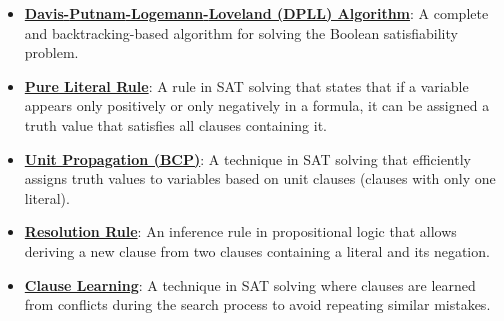 \documentclass{article}%
\begin{document}
\begin{itemize}[leftmargin=*]
\item \href{https://purdue.brightspace.com/d2l/common/assets/pdfjs-d2l-dist/1.0.14-legacy/web/viewer.html?file=\%2Fcontent\%2Fenforced\%2F1095467-wl.202510.CS.24300.001\%2F15L2-SAT.pdf\%3Fou\%3D1095467\&lang=en-us\&container=d2l-fileviewer-rendered-pdf\&fullscreen=d2l-fileviewer-rendered-pdf-dialog\&height=667#page=21}{\textbf{Davis{-}Putnam{-}Logemann{-}Loveland (DPLL) Algorithm}}: A complete and backtracking-based algorithm for solving the Boolean satisfiability problem.%
\item \href{https://purdue.brightspace.com/d2l/common/assets/pdfjs-d2l-dist/1.0.14-legacy/web/viewer.html?file=\%2Fcontent\%2Fenforced\%2F1095467-wl.202510.CS.24300.001\%2F15L2-SAT.pdf\%3Fou\%3D1095467\&lang=en-us\&container=d2l-fileviewer-rendered-pdf\&fullscreen=d2l-fileviewer-rendered-pdf-dialog\&height=667#page=19}{\textbf{Pure Literal Rule}}: A rule in SAT solving that states that if a variable appears only positively or only negatively in a formula, it can be assigned a truth value that satisfies all clauses containing it.%
\item \href{https://purdue.brightspace.com/d2l/common/assets/pdfjs-d2l-dist/1.0.14-legacy/web/viewer.html?file=\%2Fcontent\%2Fenforced\%2F1095467-wl.202510.CS.24300.001\%2F15L2-SAT.pdf\%3Fou\%3D1095467\&lang=en-us\&container=d2l-fileviewer-rendered-pdf\&fullscreen=d2l-fileviewer-rendered-pdf-dialog\&height=667#page=20}{\textbf{Unit Propagation (BCP)}}: A technique in SAT solving that efficiently assigns truth values to variables based on unit clauses (clauses with only one literal).%
\item \href{https://purdue.brightspace.com/d2l/common/assets/pdfjs-d2l-dist/1.0.14-legacy/web/viewer.html?file=\%2Fcontent\%2Fenforced\%2F1095467-wl.202510.CS.24300.001\%2F15L2-SAT.pdf\%3Fou\%3D1095467\&lang=en-us\&container=d2l-fileviewer-rendered-pdf\&fullscreen=d2l-fileviewer-rendered-pdf-dialog\&height=667#page=32}{\textbf{Resolution Rule}}: An inference rule in propositional logic that allows deriving a new clause from two clauses containing a literal and its negation.%
\item \href{https://purdue.brightspace.com/d2l/common/assets/pdfjs-d2l-dist/1.0.14-legacy/web/viewer.html?file=\%2Fcontent\%2Fenforced\%2F1095467-wl.202510.CS.24300.001\%2F15L2-SAT.pdf\%3Fou\%3D1095467\&lang=en-us\&container=d2l-fileviewer-rendered-pdf\&fullscreen=d2l-fileviewer-rendered-pdf-dialog\&height=667#page=34}{\textbf{Clause Learning}}: A technique in SAT solving where clauses are learned from conflicts during the search process to avoid repeating similar mistakes.%

\end{itemize}
\end{document}
